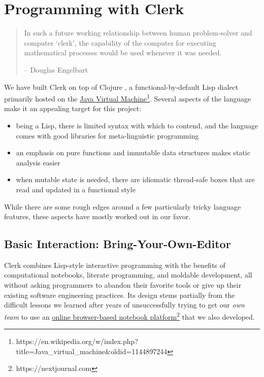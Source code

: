 \documentclass[sigconf,screen]{acmart}
\providecommand{\tightlist}{%
  \setlength{\itemsep}{0pt}\setlength{\parskip}{0pt}}
\begin{document}
\hypertarget{programming-with-clerk}{%
\section{Programming with Clerk}\label{programming-with-clerk}}

\begin{quote}
In such a future working relationship between human problem-solver and computer `clerk', the capability of the computer for executing mathematical processes would be used whenever it was needed. \cite{Engelbart_1962}

-- Douglas Engelbart
\end{quote}

We have built Clerk on top of Clojure \cite{Hickey_2020}, a functional-by-default Lisp dialect primarily hosted on the {\href{https://en.wikipedia.org/w/index.php?title=Java_virtual_machine\&oldid=1144897244}{Java Virtual Machine}\footnote{https://en.wikipedia.org/w/index.php?title=Java\_virtual\_machine\&oldid=1144897244}}. Several aspects of the language make it an appealing target for this project:

\begin{itemize}
\tightlist
\item
  being a Lisp, there is limited syntax with which to contend, and the language comes with good libraries for meta-linguistic programming
\item
  an emphasis on pure functions and immutable data structures makes static analysis easier
\item
  when mutable state is needed, there are idiomatic thread-safe boxes that are read and updated in a functional style
\end{itemize}

While there are some rough edges around a few particularly tricky language features, these aspects have mostly worked out in our favor.

\hypertarget{basic-interaction:-bring-your-own-editor}{%
\subsection{Basic Interaction: Bring-Your-Own-Editor}\label{basic-interaction:-bring-your-own-editor}}

Clerk combines Lisp-style interactive programming with the benefits of computational notebooks, literate programming, and moldable development, all without asking programmers to abandon their favorite tools or give up their existing software engineering practices. Its design stems partially from the difficult lessons we learned after years of unsuccessfully trying to get our \emph{own team} to use an {\href{https://nextjournal.com}{online browser-based notebook platform}\footnote{https://nextjournal.com}} that we also developed.
\end{document}
